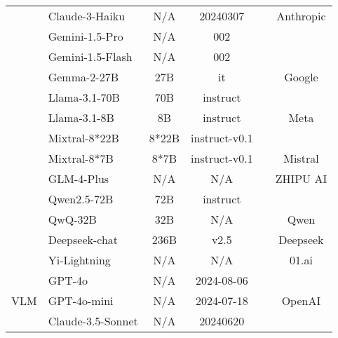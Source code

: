 \begin{table}[t]
{\begin{tabular}{c l c c c c}
& \cellcolor{modelcolor1} Claude-3-Haiku & N/A & 20240307 & \cellcolor{commercialcolor}\xmarkcolor & \multirow{-2}{*}{Anthropic} \\
\cmidrule{2-6}
& \cellcolor{modelcolor1} Gemini-1.5-Pro & N/A & 002 & \cellcolor{commercialcolor}\xmarkcolor & \\
& \cellcolor{modelcolor1} Gemini-1.5-Flash & N/A & 002 & \cellcolor{commercialcolor}\xmarkcolor &  \\
& \cellcolor{modelcolor1} Gemma-2-27B & 27B & it & \cellcolor{opensourcecolor}\checkmarkcolor & 
\multirow{-3}{*}{Google} \\
\cmidrule{2-6}
& \cellcolor{modelcolor1} Llama-3.1-70B & 70B & instruct & \cellcolor{opensourcecolor}\checkmarkcolor& \\
& \cellcolor{modelcolor1} Llama-3.1-8B & 8B & instruct & \cellcolor{opensourcecolor}\checkmarkcolor& \multirow{-2}{*}{Meta} \\
\cmidrule{2-6}
& \cellcolor{modelcolor1} Mixtral-8*22B & 8*22B & instruct-v0.1 & \cellcolor{opensourcecolor}\checkmarkcolor& \\
& \cellcolor{modelcolor1} Mixtral-8*7B & 8*7B & instruct-v0.1 & \cellcolor{opensourcecolor}\checkmarkcolor& \multirow{-2}{*}{Mistral} \\
\cmidrule{2-6}
& \cellcolor{modelcolor1} GLM-4-Plus & N/A & N/A & \cellcolor{opensourcecolor}\checkmarkcolor& ZHIPU AI \\
\cmidrule{2-6}
& \cellcolor{modelcolor1} Qwen2.5-72B & 72B & instruct & \cellcolor{opensourcecolor}\checkmarkcolor& \\
& \cellcolor{modelcolor1} QwQ-32B & 32B & N/A & \cellcolor{opensourcecolor}\checkmarkcolor& \multirow{-2}{*}{Qwen} \\
\cmidrule{2-6}
& \cellcolor{modelcolor1} Deepseek-chat & 236B & v2.5 & \cellcolor{opensourcecolor}\checkmarkcolor& Deepseek \\
\cmidrule{2-6}\
& \cellcolor{modelcolor1} Yi-Lightning & N/A & N/A & \cellcolor{commercialcolor}\xmarkcolor & \multirow{-1}{*}{01.ai} \\
\midrule
\multirow{10}{*}{VLM} 
& \cellcolor{modelcolor2} GPT-4o & N/A & 2024-08-06 & \cellcolor{commercialcolor}\xmarkcolor &  \\
& \cellcolor{modelcolor2} GPT-4o-mini & N/A & 2024-07-18 & \cellcolor{commercialcolor}\xmarkcolor & \multirow{-2}{*}{OpenAI} \\
\cmidrule{2-6}
& \cellcolor{modelcolor2} Claude-3.5-Sonnet & N/A & 20240620 & \cellcolor{commercialcolor}\xmarkcolor & \\

\end{tabular}}
\end{table}
